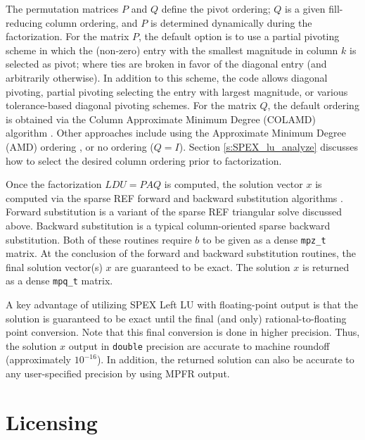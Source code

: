 \documentclass[12pt]{report}
\theoremstyle{definition}
\begin{document}
The permutation matrices $P$ and $Q$ define the pivot ordering; $Q$ is a given
fill-reducing column ordering, and $P$ is determined dynamically during the
factorization.  For the matrix $P$, the default option is to use a partial
pivoting scheme in which the (non-zero) entry with the smallest magnitude in column $k$ is selected as pivot; where ties are broken in favor of the diagonal entry (and arbitrarily otherwise). In addition to this scheme,
the code allows diagonal pivoting, partial pivoting selecting the entry with largest magnitude, or various tolerance-based diagonal pivoting schemes. For the matrix
$Q$, the default ordering is obtained via the Column Approximate Minimum Degree (COLAMD)
algorithm \cite{davis2004algorithmcolamd,davis2004column}. Other approaches
include using the Approximate Minimum Degree (AMD) ordering
\cite{amestoy1996approximate,amestoy2004algorithmamd}, or no ordering ($Q=I$). Section \ref{s:SPEX_lu_analyze} discusses how to select the desired column ordering prior to factorization.

Once the factorization $L D U = P A Q$ is computed, the solution vector
$x$ is computed via the sparse REF forward and backward substitution algorithms \cite{lourenco2019exact}.
Forward substitution is a variant of the sparse REF triangular solve discussed above. Backward substitution is a typical column-oriented sparse backward substitution. Both of these routines require $b$ to be given as a dense \verb|mpz_t| matrix. At the conclusion of the forward and
backward substitution routines, the final solution vector(s) $x$ are guaranteed to be exact.  The solution $x$ is returned as a dense \verb|mpq_t| matrix.

A key advantage of utilizing SPEX Left LU with floating-point output is that the solution is guaranteed to be exact until the final (and only) rational-to-floating point conversion. Note that this final conversion is done in higher precision. Thus, the solution $x$ output in \verb|double| precision are accurate to machine roundoff (approximately $10^{-16}$). In addition, the returned solution can also be accurate to any user-specified precision by using MPFR output.

\section{Licensing} \label{s:LeftLU:licensing}
\end{document}
